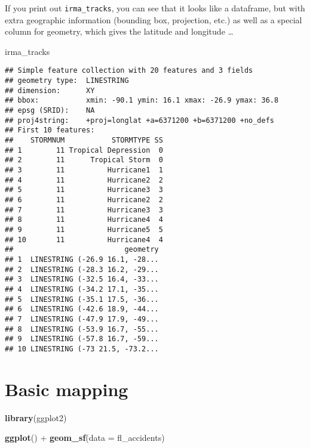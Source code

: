 \documentclass[]{tufte-book}
\newenvironment{Shaded}{}{}
\newcommand{\DataTypeTok}[1]{\textcolor[rgb]{0.56,0.13,0.00}{#1}}
\newcommand{\KeywordTok}[1]{\textcolor[rgb]{0.00,0.44,0.13}{\textbf{#1}}}
\newcommand{\NormalTok}[1]{#1}
\newcommand{\OperatorTok}[1]{\textcolor[rgb]{0.40,0.40,0.40}{#1}}
\newcommand{\StringTok}[1]{\textcolor[rgb]{0.25,0.44,0.63}{#1}}
\begin{document}
If you print out \texttt{irma\_tracks}, you can see that it looks like a dataframe, but with extra
geographic information (bounding box, projection, etc.) as well as a special column for
geometry, which gives the latitude and longitude \ldots{}

\begin{Shaded}
\begin{Highlighting}[]
\NormalTok{irma_tracks}
\end{Highlighting}
\end{Shaded}

\begin{verbatim}
## Simple feature collection with 20 features and 3 fields
## geometry type:  LINESTRING
## dimension:      XY
## bbox:           xmin: -90.1 ymin: 16.1 xmax: -26.9 ymax: 36.8
## epsg (SRID):    NA
## proj4string:    +proj=longlat +a=6371200 +b=6371200 +no_defs
## First 10 features:
##    STORMNUM           STORMTYPE SS
## 1        11 Tropical Depression  0
## 2        11      Tropical Storm  0
## 3        11          Hurricane1  1
## 4        11          Hurricane2  2
## 5        11          Hurricane3  3
## 6        11          Hurricane2  2
## 7        11          Hurricane3  3
## 8        11          Hurricane4  4
## 9        11          Hurricane5  5
## 10       11          Hurricane4  4
##                          geometry
## 1  LINESTRING (-26.9 16.1, -28...
## 2  LINESTRING (-28.3 16.2, -29...
## 3  LINESTRING (-32.5 16.4, -33...
## 4  LINESTRING (-34.2 17.1, -35...
## 5  LINESTRING (-35.1 17.5, -36...
## 6  LINESTRING (-42.6 18.9, -44...
## 7  LINESTRING (-47.9 17.9, -49...
## 8  LINESTRING (-53.9 16.7, -55...
## 9  LINESTRING (-57.8 16.7, -59...
## 10 LINESTRING (-73 21.5, -73.2...
\end{verbatim}

\hypertarget{basic-mapping}{%
\section{Basic mapping}\label{basic-mapping}}

\begin{Shaded}
\begin{Highlighting}[]
\KeywordTok{library}\NormalTok{(ggplot2)}

\KeywordTok{ggplot}\NormalTok{() }\OperatorTok{+}\StringTok{ }\KeywordTok{geom_sf}\NormalTok{(}\DataTypeTok{data =}\NormalTok{ fl_accidents)}
\end{Highlighting}
\end{Shaded}
\end{document}
